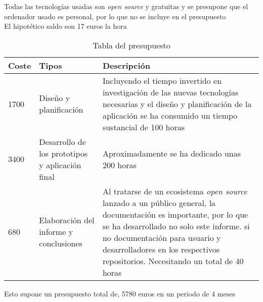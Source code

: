 Todas las tecnologías usadas son \emph{open source} y gratuitas y se presupone que el ordenador usado es personal, por lo que no se incluye en el presupuesto\\
El hipotético saldo son 17 euros la hora

\begin{comment}
\begin{center}
\begin{tabu} to 0.8\textwidth {| X[l] | X[l] | X[l] |}
 \hline
 \multicolumn{1}{|c|}{\bf Coste} & \multicolumn{1}{|c|}{\bf Tipos} & \multicolumn{1}{|c|}{\bf Descripción} \\
 \hline 4500 & Formación y Diseño & La formación en nuevas tecnologías y el diseño de la aplicación han consumido un tiempo sustancial de 300 horas\\
 \hline
 3000  & Desarrollo de los prototipos y aplicación final & Aproximadamente se ha dedicado unas 200 horas\\
 \hline
 120 & Elaboración del informe y conclusiones  & Al tratarse de un ecosistema \emph{open source} lanzado a un público general, la documentación es importante, por lo que se ha desarrollado no solo este informe. si no documentación para usuario y desarrolladores en los respectivos repositorios. \\
 \hline
\end{tabu}
\end{center}
\end{comment}
\begin{table}[H]
    \centering
    \begin{tabular}{|m{1cm}|m{4cm}|m{10cm}|}
    \hline
    \textbf{Coste} & \textbf{Tipos} & \textbf{Descripción}\\
    \hline
    1700 & Diseño y planificación & Incluyendo el tiempo invertido en investigación de las nuevas tecnologías necesarias y el diseño y planificación de la aplicación se ha consumido un tiempo sustancial de 100 horas\\
    \hline
    3400  & Desarrollo de los prototipos y aplicación final & Aproximadamente se ha dedicado unas 200 horas\\
    \hline
    680 & Elaboración del informe y conclusiones  & Al tratarse de un ecosistema \emph{open source} lanzado a un público general, la documentación es importante, por lo que se ha desarrollado no solo este informe. si no documentación para usuario y desarrolladores en los respectivos repositorios. Necesitando un total de 40 horas\\
    \hline
    \end{tabular}
    \caption{Tabla del presupuesto}
    \label{tab:budget}
\end{table}

\begin{comment}
   \begin{table}[htb]
   \centering
   \caption{Presupuesto}
   \label{table:presupuesto}
\end{table} 
\end{comment}

Esto supone un presupuesto total de, 5780 euros en un periodo de 4 meses